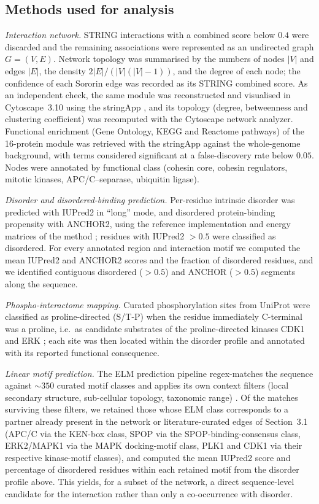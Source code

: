 \documentclass[11pt]{article}
\begin{document}
\subsection{Methods used for analysis}
\textit{Interaction network.} STRING interactions with a combined score below $0.4$ were discarded and the remaining associations were represented as an undirected graph $G=(V,E)$. Network topology was summarised by the numbers of nodes $|V|$ and edges $|E|$, the density $2|E|/(|V|(|V|-1))$, and the degree of each node; the confidence of each Sororin edge was recorded as its STRING combined score. As an independent check, the same module was reconstructed and visualised in Cytoscape~3.10 using the stringApp \citep{shannon2003,doncheva2019}, and its topology (degree, betweenness and clustering coefficient) was recomputed with the Cytoscape network analyzer. Functional enrichment (Gene Ontology, KEGG and Reactome pathways) of the 16-protein module was retrieved with the stringApp against the whole-genome background, with terms considered significant at a false-discovery rate below $0.05$. Nodes were annotated by functional class (cohesin core, cohesin regulators, mitotic kinases, APC/C--separase, ubiquitin ligase).

\textit{Disorder and disordered-binding prediction.} Per-residue intrinsic disorder was predicted with IUPred2 in ``long'' mode, and disordered protein-binding propensity with ANCHOR2, using the reference implementation and energy matrices of the method \citep{meszaros2018,dosztanyi2009}; residues with IUPred2 $>0.5$ were classified as disordered. For every annotated region and interaction motif we computed the mean IUPred2 and ANCHOR2 scores and the fraction of disordered residues, and we identified contiguous disordered ($>0.5$) and ANCHOR ($>0.5$) segments along the sequence.

\textit{Phospho-interactome mapping.} Curated phosphorylation sites from UniProt were classified as proline-directed (S/T-P) when the residue immediately C-terminal was a proline, i.e.\ as candidate substrates of the proline-directed kinases CDK1 and ERK \citep{dreier2011,nguyen2010}; each site was then located within the disorder profile and annotated with its reported functional consequence.

\textit{Linear motif prediction.} The ELM prediction pipeline regex-matches the sequence against $\sim\!350$ curated motif classes and applies its own context filters (local secondary structure, sub-cellular topology, taxonomic range) \citep{kumar2024}. Of the matches surviving these filters, we retained those whose ELM class corresponds to a partner already present in the network or literature-curated edges of Section~3.1 (APC/C via the KEN-box class, SPOP via the SPOP-binding-consensus class, ERK2/MAPK1 via the MAPK docking-motif class, PLK1 and CDK1 via their respective kinase-motif classes), and computed the mean IUPred2 score and percentage of disordered residues within each retained motif from the disorder profile above. This yields, for a subset of the network, a direct sequence-level candidate for the interaction rather than only a co-occurrence with disorder.
\end{document}
